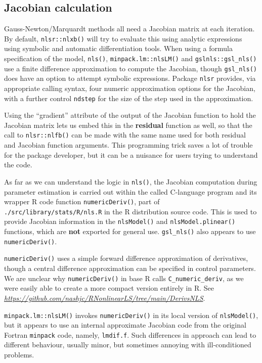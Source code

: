 \documentclass[
]{article}
\begin{document}
\hypertarget{jacobian-calculation}{%
\subsection{Jacobian calculation}\label{jacobian-calculation}}

Gauss-Newton/Marquardt methods all need a Jacobian matrix at each
iteration. By default, \texttt{nlsr::nlxb()} will try to evaluate this
using analytic expressions using symbolic and automatic differentiation
tools. When using a formula specification of the model, \texttt{nls()},
\texttt{minpack.lm::nlsLM()} and \texttt{gslnls::gsl\_nls()} use a
finite difference approximation to compute the Jacobian, though
\texttt{gsl\_nls()} does have an option to attempt symbolic expressions.
Package \texttt{nlsr} provides, via appropriate calling syntax, four
numeric approximation options for the Jacobian, with a further control
\texttt{ndstep} for the size of the step used in the approximation.

Using the ``gradient'' attribute of the output of the Jacobian function
to hold the Jacobian matrix lets us embed this in the \textbf{residual}
function as well, so that the call to \texttt{nlsr::nlfb()} can be made
with the same name used for both residual and Jacobian function
arguments. This programming trick saves a lot of trouble for the package
developer, but it can be a nuisance for users trying to understand the
code.

As far as we can understand the logic in \texttt{nls()}, the Jacobian
computation during parameter estimation is carried out within the called
C-language program and its wrapper R code function
\texttt{numericDeriv()}, part of \texttt{./src/library/stats/R/nls.R} in
the R distribution source code. This is used to provide Jacobian
information in the \texttt{nlsModel()} and \texttt{nlsModel.plinear()}
functions, which are \textbf{not} exported for general use.
\texttt{gsl\_nls()} also appears to use \texttt{numericDeriv()}.

\texttt{numericDeriv()} uses a simple forward difference approximation
of derivatives, though a central difference approximation can be
specified in control parameters. We are unclear why
\texttt{numericDeriv()} in base R calls \texttt{C\_numeric\_deriv}, as
we were easily able to create a more compact version entirely in R. See
\emph{\url{https://github.com/nashjc/RNonlinearLS/tree/main/DerivsNLS}}.

\texttt{minpack.lm::nlsLM()} invokes \texttt{numericDeriv()} in its
local version of \texttt{nlsModel()}, but it appears to use an internal
approximate Jacobian code from the original Fortran \texttt{minpack}
code, namely, \texttt{lmdif.f}. Such differences in approach can lead to
different behaviour, usually minor, but sometimes annoying with
ill-conditioned problems.
\end{document}
